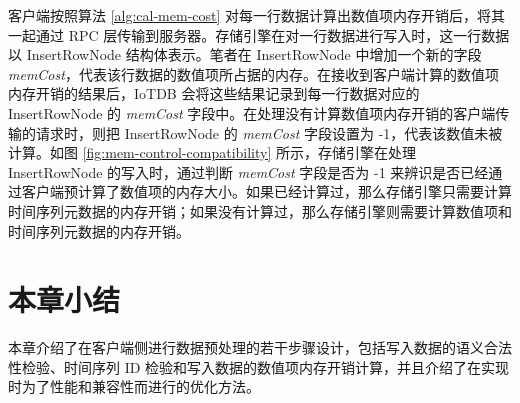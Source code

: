 客户端按照算法 \ref{alg:cal-mem-cost} 对每一行数据计算出数值项内存开销后，将其一起通过 RPC 层传输到服务器。存储引擎在对一行数据进行写入时，这一行数据以 InsertRowNode 结构体表示。笔者在 InsertRowNode 中增加一个新的字段 \emph{memCost}，代表该行数据的数值项所占据的内存。在接收到客户端计算的数值项内存开销的结果后，IoTDB 会将这些结果记录到每一行数据对应的 InsertRowNode 的 \emph{memCost} 字段中。在处理没有计算数值项内存开销的客户端传输的请求时，则把 InsertRowNode 的 \emph{memCost} 字段设置为 -1，代表该数值未被计算。如图 \ref{fig:mem-control-compatibility} 所示，存储引擎在处理 InsertRowNode 的写入时，通过判断 \emph{memCost} 字段是否为 -1 来辨识是否已经通过客户端预计算了数值项的内存大小。如果已经计算过，那么存储引擎只需要计算时间序列元数据的内存开销；如果没有计算过，那么存储引擎则需要计算数值项和时间序列元数据的内存开销。

\section{本章小结}
本章介绍了在客户端侧进行数据预处理的若干步骤设计，包括写入数据的语义合法性检验、时间序列 ID 检验和写入数据的数值项内存开销计算，并且介绍了在实现时为了性能和兼容性而进行的优化方法。
